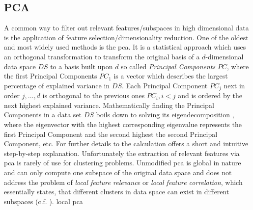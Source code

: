 \subsection{PCA}
A common way to filter out relevant features/subspaces in high dimensional data is the application of feature selection/dimensionality reduction. One of the oldest and most widely used methods is the \gls{pca}. It is a statistical approach which uses an orthogonal transformation to transform the original basis of a $d$-dimensional data space $DS$ to a basis built upon $d$ so called \textit{Principal Components} $PC$, where the first Principal Components $PC_1$ is a vector which describes the largest percentage of explained variance in $DS$. Each Principal Component $PC_j$ next in order $j,\dotsc,d$ is orthogonal to the previous ones $PC_i, i<j$ and is ordered by the next highest explained variance. Mathematically finding the Principal Components in a data set $DS$ boils down to solving its eigendecomposition , where the eigenvector with the highest corresponding eigenvalue represents the first Principal Component and the second highest the second Principal Component, etc\cite{pcawold1987principal}. For further details to the calculation \textcite{pcamljolliffe1986principal} offers a short and intuitive step-by-step explanation.
Unfortunately the extraction of relevant features via \gls{pca} is rarely of use for clustering problems. Unmodified \gls{pca} is global in nature and can only compute one subspace of the original data space and does not address the problem of \textit{local feature relevance} or \textit{local feature correlation}, which essentially states, that different clusters in data space can exist in different subspaces\cite{kriegel2009clustering} (c.f. \cite{PCAshlens2014tutorial}). 
local pca

